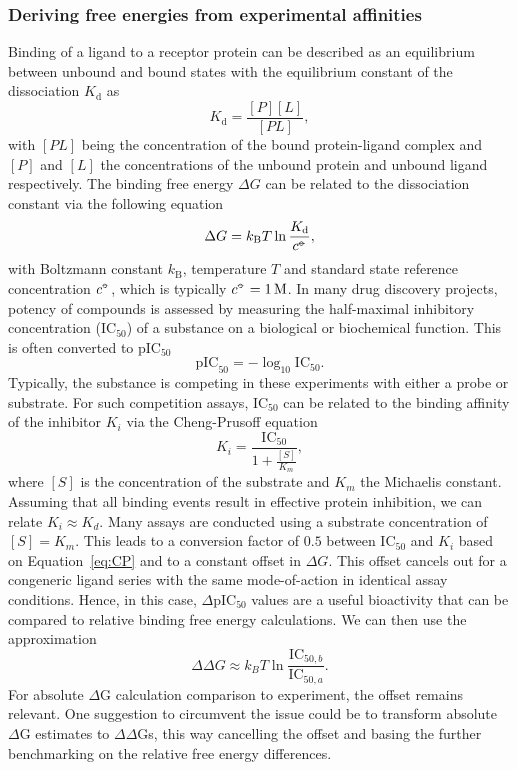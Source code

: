 \documentclass[9pt,bestpractices]{livecoms}
\newcommand\standardstate{{\circ\kern-0.495em-}}
\begin{document}
\subsubsection{Deriving free energies from experimental affinities}
Binding of a ligand to a receptor protein can be described as an equilibrium between unbound and bound states with the equilibrium constant of the dissociation $K_\mathrm{d}$ as
\begin{equation*}
    K_\mathrm{d} = \frac{[P][L]}{[PL]},
\end{equation*}
with $[PL]$ being the concentration of the bound protein-ligand complex and $[P]$ and $[L]$ the concentrations of the unbound protein and unbound ligand respectively. The binding free energy $\Delta G$ can be related to the dissociation constant via the following equation
\begin{equation}
    \label{eq:kdtodg}
    \Delta G = k_\mathrm{B} T \ln \frac{K_\mathrm{d}}{c^{\standardstate}},
\end{equation}
with Boltzmann constant $k_\mathrm{B}$, temperature $T$ and standard state reference concentration $c^{\standardstate}$, which is typically $c^{\standardstate}=1\,\mathrm{M}$. 
In many drug discovery projects, potency of compounds is assessed by measuring the half-maximal inhibitory concentration (IC$_{50}$) of a substance on a biological or biochemical function. This is often converted to pIC$_{50}$
\begin{equation*}
    \label{eq:pic50}
    \mathrm{pIC}_{50} = - \log_{10} \mathrm{IC}_{50}.
\end{equation*}
Typically, the substance is competing in these experiments with either a probe or substrate. For such competition assays, IC$_{50}$ can be related to the binding affinity of the inhibitor $K_i$ via the Cheng-Prusoff equation
\begin{equation}
\label{eq:CP}
    K_i = \frac{\mathrm{IC}_{50}}{1+\tfrac{[S]}{K_m}},
\end{equation}
where $[S]$ is the concentration of the substrate and $K_m$ the Michaelis constant. 
Assuming that all binding events result in effective protein inhibition, we can relate $K_i \approx K_d$.
Many assays are conducted using a substrate concentration of $[S] = K_m$. This leads to a conversion factor of $0.5$ between IC$_{50}$ and $K_i$ based on Equation~\ref{eq:CP} and to a constant offset in $\Delta G$. This offset cancels out for a congeneric ligand series with the same mode-of-action in identical assay conditions. Hence, in this case, $\Delta $pIC$_{50}$ values are a useful bioactivity that can be compared to relative binding free energy calculations. We can then use the approximation
\begin{equation*}
    \label{eq:ic50todg}
    \Delta\Delta G \approx k_B T \ln \frac{\mathrm{IC}_{50,b}}{\mathrm{IC}_{50,a}}.
\end{equation*}
%
For absolute $\Delta$G calculation comparison to experiment, the offset remains relevant. One suggestion to circumvent the issue could be to transform absolute $\Delta$G estimates to $\Delta\Delta$Gs, this way cancelling the offset and basing the further benchmarking on the relative free energy differences.
\end{document}
